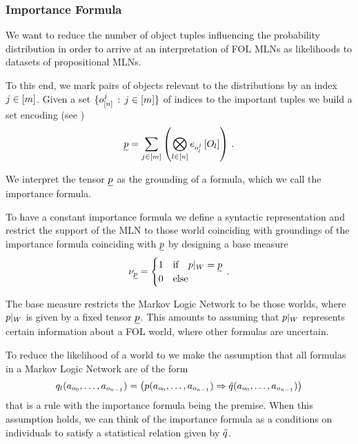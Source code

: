 	
	
\subsubsection{Importance Formula}


We want to reduce the number of object tuples influencing the probability distribution in order to arrive at an interpretation of FOL MLNs as likelihoods to datasets of propositional MLNs.

To this end, we mark pairs of objects relevant to the distributions by an index $j\in[m]$.
Given a set $\{o_{[n]}^{j} \, : \, j\in[m] \}$ of indices to the important tuples we build a set encoding (see )
\begin{align*}
	\underline{p} = \sum_{j\in[m]} \left(
		 \bigotimes_{l\in[n]} e_{o_{l}^{j}}\left[O_{l}\right] 
	 \right) \, . 
\end{align*}

We interpret the tensor $\underline{p}$ as the grounding of a formula, which we call the importance formula.

To have a constant importance formula we define a syntactic representation and restrict the support of the MLN to those world coinciding with groundings of the importance formula coinciding with $\underline{p}$ by designing a base measure
\begin{align*}
	\nu_{\underline{p}}= \begin{cases}
		1 & \text{if} \quad {p}|_{W} = \underline{p} \\
		0 & \text{else}
	\end{cases} \, . 
\end{align*}

The base measure restricts the Markov Logic Network to be those worlds, where ${p}|_{W}$ is given by a fixed tensor $\underline{p}$.
This amounts to assuming that ${p}|_{W}$ represents certain information about a FOL world, where other formulas are uncertain.



To reduce the likelihood of a world to we make the assumption that all formulas in a Markov Logic Network are of the form
\begin{align}\label{eq:folImplicationForm}
	q_{l}(a_{o_{0}},\ldots,a_{o_{n-1}}) =
	\left( p(a_{o_{0}},\ldots,a_{o_{n-1}}) \Rightarrow \tilde{q}(a_{o_{0}},\ldots,a_{o_{n-1}}) \right) 
\end{align}
that is a rule with the importance formula being the premise.
When this assumption holds, we can think of the importance formula as a conditions on individuals to satisfy a statistical relation given by $\tilde{q}$.

